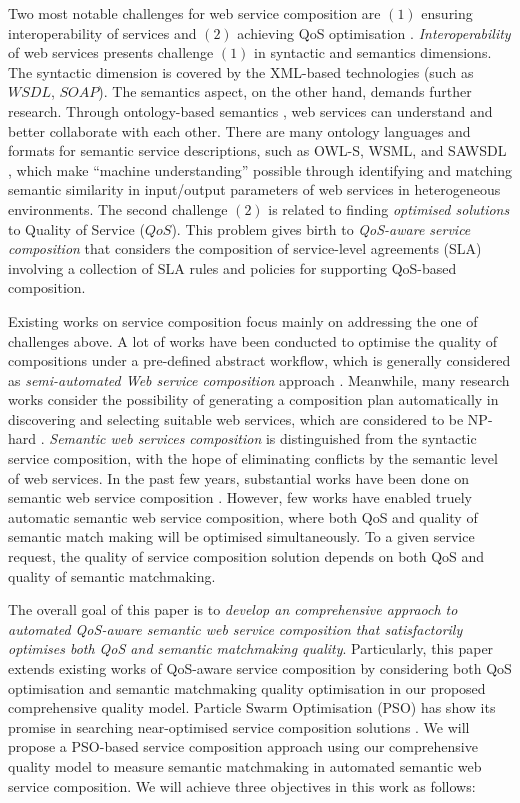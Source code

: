 \documentclass{IEEEtran}
\begin{document}
Two most notable challenges for web service composition are $(1)$ ensuring interoperability of services and $(2)$ achieving QoS optimisation \cite{fensel2011semantic}. \textit{Interoperability} of web services presents challenge $(1)$ in syntactic and semantics dimensions. The syntactic dimension is covered by the XML-based technologies (such as $WSDL$, $SOAP$). The semantics aspect, on the other hand, demands further research. Through ontology-based semantics \cite{o2005review}, web services can understand and better collaborate with each other. There are many ontology languages and formats for semantic service descriptions, such as OWL-S, WSML, and SAWSDL \cite{petrie2016web}, which make ``machine understanding'' possible through identifying and matching semantic similarity in input/output parameters of web services in heterogeneous environments. The second challenge $(2)$ is related to finding \textit{optimised solutions} to Quality of Service ($QoS$). This problem gives birth to \textit{QoS-aware service composition} that considers the composition of service-level agreements (SLA) \cite {sahai2002automated} involving a collection of SLA rules and policies for supporting QoS-based composition.

Existing works on service composition focus mainly on addressing the one of challenges above. A lot of works have been conducted to optimise the quality of compositions under a pre-defined abstract workflow, which is generally considered as \textit{semi-automated Web service composition} approach \cite{parejo2008qos,bahadori2009optimal}. Meanwhile, many research works consider the possibility of generating a composition plan automatically in discovering and selecting suitable web services, which are considered to be NP-hard \cite{moghaddam2014service}. \textit{Semantic web services composition} is distinguished from the syntactic service composition, with the hope of eliminating conflicts by the semantic level of web services. In the past few years, substantial works have been done on semantic web service composition \cite{lecue2009optimizing,fanjiang2014semantic,pop2009immune}. However, few works have enabled truely automatic semantic web service composition, where both QoS and quality of semantic match making will be optimised simultaneously. To a given service request, the quality of service composition solution depends on both QoS and quality of semantic matchmaking.

The overall goal of this paper is to \textit{develop an comprehensive appraoch to automated QoS-aware semantic web service composition that satisfactorily optimises both QoS and semantic matchmaking quality}. Particularly, this paper extends existing works of QoS-aware service composition by considering both QoS optimisation and semantic matchmaking quality optimisation in our proposed comprehensive quality model. Particle Swarm Optimisation (PSO) has show its promise in searching near-optimised service composition solutions \cite{da2016particle}. We will propose a PSO-based service composition approach using our comprehensive quality model to measure semantic matchmaking in automated semantic web service composition. We will achieve three objectives in this work as follows:
\end{document}
